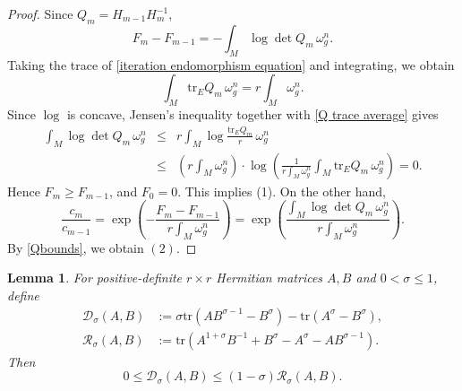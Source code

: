 \documentclass[12pt, reqno]{amsart}
\newcommand\cD{{\mathcal D}}
\newcommand\cR{{\mathcal R}}
\theoremstyle{plain}
\newtheorem{lemma}[thm]{Lemma}
\theoremstyle{definition}
\newcommand{\blemma}{\begin{lemma}}
\newcommand{\elemma}{\end{lemma}}
\newcommand{\beq}{\begin{equation}}
\newcommand{\eeq}{\end{equation}}
\renewcommand{\>}{\rightarrow}
\newcommand{\om}{\omega}
\newcommand{\tr}{\mathrm{tr}}
\numberwithin{equation}{section}
\begin{document}
\begin{proof}
	Since $Q_m=H_{m-1}H_m^{-1}$,
	\begin{equation}
	F_m-F_{m-1}=-\int_M\log\det Q_m\,\omega_g^n.
	\label{F difference}
	\end{equation}
	Taking the trace of \eqref{iteration endomorphism equation} and integrating, we obtain
	\begin{equation}
	\int_M\tr_EQ_m\,\omega_g^n=r\int_M\om_g^n.
	\label{Q trace average}
	\end{equation}
	Since $\log$ is concave, Jensen's inequality together with \eqref{Q trace average}
	gives
	\begin{eqnarray}
	\int_M\log\det Q_m\,\omega_g^n
	&\leq& r\int_M\log\frac{\tr_EQ_m}{r}\,\omega_g^n\nonumber\\
	&\leq&\left( r\int_M\om_g^n\right)\cdot 
	\log\left(
	\frac{1}{r\int_M\om_g^n}\int_M\tr_EQ_m\,\omega_g^n
	\right)=0.
	\end{eqnarray}
	Hence $F_m\geq F_{m-1}$, and $F_0=0$. This implies (1). On the other hand, 
	\beq \frac{c_m}{c_{m-1}}=\exp\left(-\frac{F_m-F_{m-1}}{r\int_M\om_g^n}\right)=\exp\left(\frac{\int_M\log\det Q_m\,\omega_g^n}{r\int_M\om_g^n}\right).\eeq 
	By \eqref{Qbounds}, we obtain $(2)$. 
\end{proof}





\blemma\label{matrix remainder lemma}
For positive-definite $r\times r$ Hermitian matrices $A,B$  and $0<\sigma\leq1$, define
\begin{align}
\cD_\sigma(A,B)
&:=\sigma\tr\left(AB^{\sigma-1}-B^\sigma\right)
-\tr\left(A^\sigma-B^\sigma\right),
\label{D sigma definition}\\
\cR_\sigma(A,B)
&:=\tr\left(A^{1+\sigma}B^{-1}+B^\sigma-A^\sigma-AB^{\sigma-1}\right).
\label{R sigma definition}
\end{align}
Then 
\begin{equation}
0\leq\cD_\sigma(A,B)
\leq(1-\sigma)\cR_\sigma(A,B).
\label{matrix remainder inequality}
\end{equation}
\elemma
\end{document}
